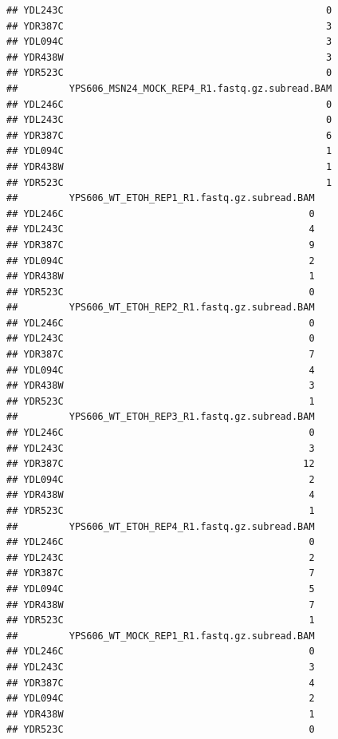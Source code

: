 \documentclass[
]{book}
\begin{document}
\begin{verbatim}
## YDL243C                                              0
## YDR387C                                              3
## YDL094C                                              3
## YDR438W                                              3
## YDR523C                                              0
##         YPS606_MSN24_MOCK_REP4_R1.fastq.gz.subread.BAM
## YDL246C                                              0
## YDL243C                                              0
## YDR387C                                              6
## YDL094C                                              1
## YDR438W                                              1
## YDR523C                                              1
##         YPS606_WT_ETOH_REP1_R1.fastq.gz.subread.BAM
## YDL246C                                           0
## YDL243C                                           4
## YDR387C                                           9
## YDL094C                                           2
## YDR438W                                           1
## YDR523C                                           0
##         YPS606_WT_ETOH_REP2_R1.fastq.gz.subread.BAM
## YDL246C                                           0
## YDL243C                                           0
## YDR387C                                           7
## YDL094C                                           4
## YDR438W                                           3
## YDR523C                                           1
##         YPS606_WT_ETOH_REP3_R1.fastq.gz.subread.BAM
## YDL246C                                           0
## YDL243C                                           3
## YDR387C                                          12
## YDL094C                                           2
## YDR438W                                           4
## YDR523C                                           1
##         YPS606_WT_ETOH_REP4_R1.fastq.gz.subread.BAM
## YDL246C                                           0
## YDL243C                                           2
## YDR387C                                           7
## YDL094C                                           5
## YDR438W                                           7
## YDR523C                                           1
##         YPS606_WT_MOCK_REP1_R1.fastq.gz.subread.BAM
## YDL246C                                           0
## YDL243C                                           3
## YDR387C                                           4
## YDL094C                                           2
## YDR438W                                           1
## YDR523C                                           0

\end{verbatim}
\end{document}

